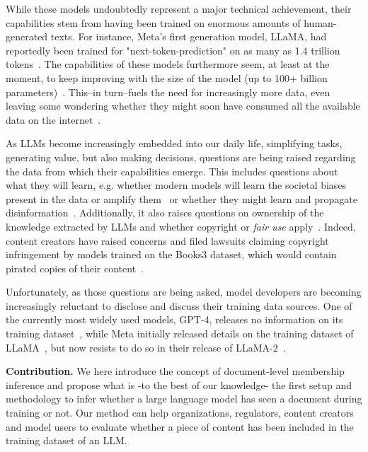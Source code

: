 \documentclass[twocolumn,10pt]{article}
\begin{document}
While these models undoubtedly represent a major technical achievement, their capabilities stem from having been trained on enormous amounts of human-generated texts. For instance, Meta's first generation model, LLaMA, had reportedly been trained for "next-token-prediction" on as many as 1.4 trillion tokens~\cite{touvron2023llama}. The capabilities of these models furthermore seem, at least at the moment, to keep improving with the size of the model (up to 100+ billion parameters)~\cite{bender2021dangers,kaplan2020scaling}. This--in turn--fuels the need for increasingly more data, even leaving some wondering whether they might soon have consumed all the available data on the internet~\cite{villalobos2022will}. 

As LLMs become increasingly embedded into our daily life, simplifying tasks, generating value, but also making decisions, questions are being raised regarding the data from which their capabilities emerge. This includes questions about what they will learn, e.g. whether modern models will learn the societal biases present in the data or amplify them~\cite{sheng2019woman,nadeem2020stereoset,abid2021persistent} or whether they might learn and propagate disinformation~\cite{zhang2023siren,bloombergminformation,barnard2023self,nytimeschatgptdisinformation}. Additionally, it also raises questions on ownership of the knowledge extracted by LLMs and whether copyright or \emph{fair use} apply~\cite{samuelson2023generative}. Indeed, content creators have raised concerns and filed lawsuits claiming copyright infringement by models trained on the Books3 dataset, which would contain pirated copies of their content~\cite{silvermanmeta,authorsguild}.

Unfortunately, as those questions are being asked, model developers are becoming increasingly reluctant to disclose and discuss their training data sources. One of the currently most widely used models, GPT-4, releases no information on its training dataset~\cite{gpt4techreport}, while Meta initially released details on the training dataset of LLaMA~\cite{touvron2023llama}, but now resists to do so in their release of LLaMA-2~\cite{touvron2023llama2}. 

\textbf{Contribution.} We here introduce the concept of document-level membership inference and propose what is -to the best of our knowledge- the first setup and methodology to infer whether a large language model has seen a document during training or not.  Our method can help organizations, regulators, content creators and model users to evaluate whether a piece of content has been included in the training dataset of an LLM. 
\end{document}
